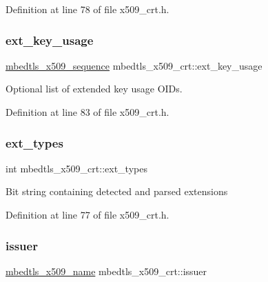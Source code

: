 Definition at line 78 of file x509\+\_\+crt.\+h.

\mbox{\label{structmbedtls__x509__crt_ac94f7360a7143ce1b983fab46c34dcf2}} 
\subsubsection{\texorpdfstring{ext\+\_\+key\+\_\+usage}{ext\_key\_usage}}
{\footnotesize\ttfamily \mbox{\hyperlink{group__x509__module_gabd52d60a09315854d9ef849d02154f35}{mbedtls\+\_\+x509\+\_\+sequence}} mbedtls\+\_\+x509\+\_\+crt\+::ext\+\_\+key\+\_\+usage}

Optional list of extended key usage O\+I\+Ds. 

Definition at line 83 of file x509\+\_\+crt.\+h.

\mbox{\label{structmbedtls__x509__crt_a60878e1cb7a3058f19042d8f189158b0}} 
\subsubsection{\texorpdfstring{ext\+\_\+types}{ext\_types}}
{\footnotesize\ttfamily int mbedtls\+\_\+x509\+\_\+crt\+::ext\+\_\+types}

Bit string containing detected and parsed extensions 

Definition at line 77 of file x509\+\_\+crt.\+h.

\mbox{\label{structmbedtls__x509__crt_ade48d67edd24629e28361d3fbc0aafd9}} 
\subsubsection{\texorpdfstring{issuer}{issuer}}
{\footnotesize\ttfamily \mbox{\hyperlink{group__x509__module_ga2272228c7776102328df31623af3168c}{mbedtls\+\_\+x509\+\_\+name}} mbedtls\+\_\+x509\+\_\+crt\+::issuer}


